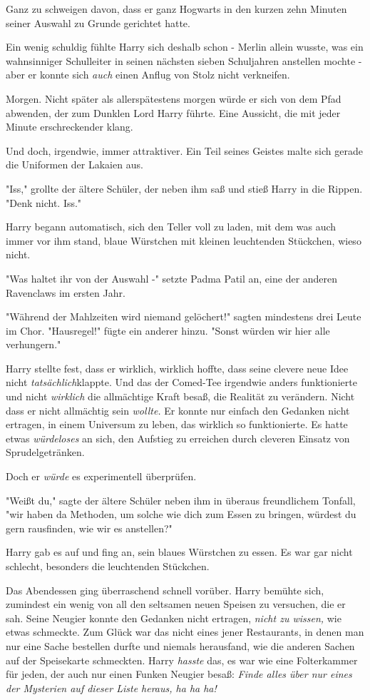 {Ganz zu schweigen davon, dass er ganz Hogwarts in den kurzen zehn Minuten seiner Auswahl zu Grunde gerichtet hatte.

Ein wenig schuldig fühlte Harry sich deshalb schon - Merlin allein wusste, was ein wahnsinniger Schulleiter in seinen nächsten sieben Schuljahren anstellen mochte - aber er konnte sich \emph{auch} einen Anflug von Stolz nicht verkneifen.

Morgen. Nicht später als allerspätestens morgen würde er sich von dem Pfad abwenden, der zum Dunklen Lord Harry führte. Eine Aussicht, die mit jeder Minute erschreckender klang.

Und doch, irgendwie, immer attraktiver. Ein Teil seines Geistes malte sich gerade die Uniformen der Lakaien aus.

"Iss," grollte der ältere Schüler, der neben ihm saß und stieß Harry in die Rippen. "Denk nicht. Iss."

Harry begann automatisch, sich den Teller voll zu laden, mit dem was auch immer vor ihm stand, blaue Würstchen mit kleinen leuchtenden Stückchen, wieso nicht.

"Was haltet ihr von der Auswahl -" setzte Padma Patil an, eine der anderen Ravenclaws im ersten Jahr.

"Während der Mahlzeiten wird niemand gelöchert!" sagten mindestens drei Leute im Chor. "Hausregel!" fügte ein anderer hinzu. "Sonst würden wir hier alle verhungern."

Harry stellte fest, dass er wirklich, wirklich hoffte, dass seine clevere neue Idee nicht \emph{tatsächlich}klappte. Und das der Comed-Tee irgendwie anders funktionierte und nicht \emph{wirklich} die allmächtige Kraft besaß, die Realität zu verändern. Nicht dass er nicht allmächtig sein \emph{wollte.} Er konnte nur einfach den Gedanken nicht ertragen, in einem Universum zu leben, das wirklich so funktionierte. Es hatte etwas \emph{würdeloses} an sich, den Aufstieg zu erreichen durch cleveren Einsatz von Sprudelgetränken.

Doch er \emph{würde} es experimentell überprüfen.

"Weißt du," sagte der ältere Schüler neben ihm in überaus freundlichem Tonfall, "wir haben da Methoden, um solche wie dich zum Essen zu bringen, würdest du gern rausfinden, wie wir es anstellen?"

Harry gab es auf und fing an, sein blaues Würstchen zu essen. Es war gar nicht schlecht, besonders die leuchtenden Stückchen.

Das Abendessen ging überraschend schnell vorüber. Harry bemühte sich, zumindest ein wenig von all den seltsamen neuen Speisen zu versuchen, die er sah. Seine Neugier konnte den Gedanken nicht ertragen, \emph{nicht zu wissen,} wie etwas schmeckte. Zum Glück war das nicht eines jener Restaurants, in denen man nur eine Sache bestellen durfte und niemals herausfand, wie die anderen Sachen auf der Speisekarte schmeckten. Harry \emph{hasste} das, es war wie eine Folterkammer für jeden, der auch nur einen Funken Neugier besaß: \emph{Finde alles über nur eines der Mysterien auf dieser Liste heraus, ha ha ha!}

}
